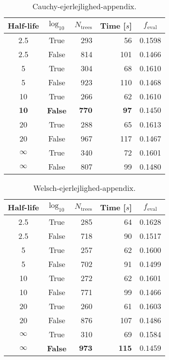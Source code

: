 
\begin{table}[h!]
  \begin{tabular}{@{}ccrrc@{}}
    Half-life & $\log_{10}$ & $N_\mathrm{trees}$ & Time [$s$] & $f_\mathrm{eval}$ \\
    \midrule
    \num{2.5} & True & \num{293} & \num{56} & \num{0.1598} \\
    \num{2.5} & False & \num{814} & \num{101} & \num{0.1466} \\
    \num{5} & True & \num{304} & \num{68} & \num{0.1610} \\
    \num{5} & False & \num{923} & \num{110} & \num{0.1468} \\
    \num{10} & True & \num{266} & \num{62} & \num{0.1610} \\
    $\mathbf{10}$ & \textbf{False} & $\mathbf{770}$ & $\mathbf{97}$ & $\mathbf{0.1450}$ \\
    \num{20} & True & \num{288} & \num{65} & \num{0.1613} \\
    \num{20} & False & \num{967} & \num{117} & \num{0.1467} \\
    $\infty$ & True & \num{340} & \num{72} & \num{0.1601} \\
    $\infty$ & False & \num{807} & \num{99} & \num{0.1480} \\
  \end{tabular}
  \caption{\label{tab:h:HPO_initial_Cauchy-ejerlejlighed-appendix}Cauchy-ejerlejlighed-appendix.}
\end{table}


\begin{table}[h!]
  \begin{tabular}{@{}ccrrc@{}}
    Half-life & $\log_{10}$ & $N_\mathrm{trees}$ & Time [$s$] & $f_\mathrm{eval}$ \\
    \midrule
    \num{2.5} & True & \num{285} & \num{64} & \num{0.1628} \\
    \num{2.5} & False & \num{718} & \num{90} & \num{0.1517} \\
    \num{5} & True & \num{257} & \num{62} & \num{0.1600} \\
    \num{5} & False & \num{702} & \num{91} & \num{0.1499} \\
    \num{10} & True & \num{272} & \num{62} & \num{0.1601} \\
    \num{10} & False & \num{771} & \num{99} & \num{0.1466} \\
    \num{20} & True & \num{260} & \num{61} & \num{0.1603} \\
    \num{20} & False & \num{876} & \num{107} & \num{0.1486} \\
    $\infty$ & True & \num{310} & \num{69} & \num{0.1584} \\
    $\bm{\infty}$ & \textbf{False} & $\mathbf{973}$ & $\mathbf{115}$ & $\mathbf{0.1459}$ \\
  \end{tabular}
  \caption{\label{tab:h:HPO_initial_Welsch-ejerlejlighed-appendix}Welsch-ejerlejlighed-appendix.}
\end{table}

